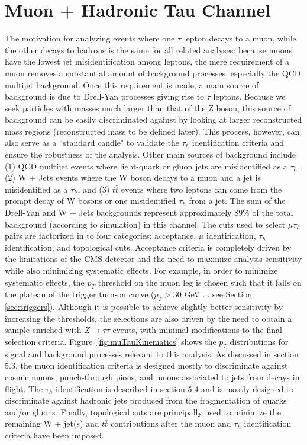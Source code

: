 \section{Muon + Hadronic Tau Channel}\label{sec:muTauhad}

The motivation for analyzing events where one $\tau$ lepton decays to a muon,
while the other decays to hadrons is the same for all \ditau related analyses: because
muons have the lowest jet misidentification among leptons, the mere requirement of a
muon removes a substantial amount of background processes, especially the QCD multijet background. Once this requirement
is made, a main source of background is due to Drell-Yan
processes giving rise to $\tau$ leptons. Because we seek particles with masses
much larger than that of the Z boson, this source of background can be easily discriminated
against by looking at larger reconstructed \ditau mass regions (reconstructed mass to be defined later). This process,
however, can also serve as a ``standard candle" to validate the $\tau_{h}$ identification criteria and
ensure the robustness of the analysis. Other main sources 
of background include (1) QCD multijet events where light-quark or gluon jets are misidentified 
as a $\tau_{h}$, (2) W + Jets events where the W boson decays to a muon and a jet is
misidentified as a $\tau_{h}$, and (3) $t\bar{t}$ events where two leptons can
come from the prompt decay of W bosons or one misidentified $\tau_{h}$ from a jet. The sum of the Drell-Yan and W + Jets backgrounds represent 
approximately $89$\% of the total background (according to simulation) in this channel.  The 
cuts used to select $\mu\tau_{h}$ pairs are factorized in to four categories: acceptance, 
$\mu$ identification, $\tau_{h}$ identification, and topological cuts. Acceptance criteria is completely
driven by the limitations of the CMS detector and the need to maximize analysis
sensitivity while also minimizing systematic effects. For example, in order to minimize systematic effects, the
$p_{T}$ threshold on the muon leg is chosen such that it falls on the plateau of the trigger turn-on curve ($p_{T} > 30$ GeV ... see Section \ref{sec:triggers}). 
Although it is possible to achieve slightly better sensitivity by increasing the thresholds,
the selections are also driven by the need to obtain a sample enriched with $Z\to\tau\tau$ events, 
with minimal modifications to the final selection criteria. 
Figure~\ref{fig:muTauKinematics} shows 
the $p_{T}$ distributions for signal and background processes relevant to this analysis. 
As discussed in section 5.3, the muon identification criteria is designed mostly to discriminate
against cosmic muons, punch-through pions, and muons associated to jets 
from decays in flight. The $\tau_{h}$ identification is described in section 5.4 and is mostly designed to
discriminate against hadronic jets produced from the fragmentation of quarks and/or
gluons. Finally, topological cuts are principally used to minimize the remaining W + jet(s)
and $t\bar{t}$ contributions after the muon and $\tau_{h}$ identification criteria have been
imposed. 

